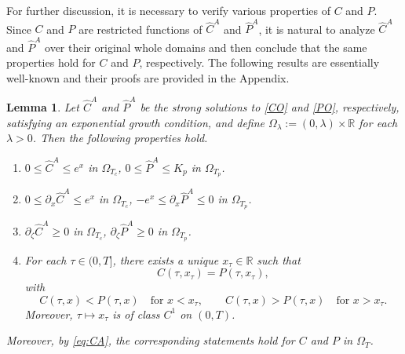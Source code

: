 \documentclass[11pt, a4paper, leqno]{amsart}
\numberwithin{equation}{section}
\theoremstyle{plain}
\newtheorem{lemma}[theorem]{Lemma}
\theoremstyle{definition}
\theoremstyle{remark}
\def\le{\leqslant}
\def\ge{\geqslant}
\begin{document}
For further discussion, it is necessary to  verify various properties of ${C}$ and ${P}$. 
Since ${C}$ and ${P}$ are restricted functions of $\widehat{C}^A$ and $\widehat{P}^A$, it is natural to analyze $\widehat{C}^A$ and $\widehat{P}^A$ over their original whole domains
and then conclude that the same properties hold for ${C}$ and ${P}$, respectively. The following results are essentially well-known and their proofs are provided in the Appendix. 
\begin{lemma}\label{lem:inequalityCP}
Let $\widehat{C}^A$ and $\widehat{P}^A$ be the {strong solutions to
\eqref{CO} and \eqref{PO}, respectively, satisfying an exponential
growth condition}, and define
$\Omega_{\lambda}:=(0,\lambda)\times\mathbb{R}$ for each $\lambda>0$.
Then the following properties hold.

\begin{enumerate}[label=(\roman*)]

\item
{
$0 \le \widehat{C}^A \le e^x$ in $\Omega_{T_c}$,
\quad
$0 \le \widehat{P}^A \le K_p$ in $\Omega_{T_p}$.
}

\item
$0\le \partial_x \widehat{C}^A \le e^x$ in $\Omega_{T_c}$,
\quad
$-e^{x}\le \partial_x \widehat{P}^A \le 0$ in $\Omega_{T_p}$.

\item
$\partial_\zeta \widehat{C}^A \ge 0$ in $\Omega_{T_c}$,
\quad
$\partial_\zeta \widehat{P}^A \ge 0$ in $\Omega_{T_p}$.

\item
{
For each $\tau\in(0,T]$, there exists a unique $x_\tau\in\mathbb R$
such that
\[
    C(\tau,x_\tau)=P(\tau,x_\tau),
\]
with
\[
    C(\tau,x)<P(\tau,x)\quad\text{for }x<x_\tau,
    \qquad
    C(\tau,x)>P(\tau,x)\quad\text{for }x>x_\tau.
\]
Moreover, $\tau\mapsto x_\tau$ is of class $C^1$ on $(0,T)$.
}

\end{enumerate}

Moreover, by \eqref{eq:CA}, the corresponding statements hold for
$C$ and $P$ in $\Omega_T$.
\end{lemma}

\end{document}

